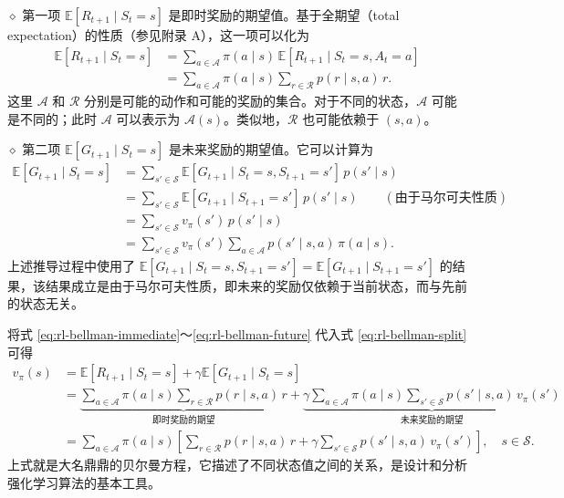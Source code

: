 \medskip
$\diamond$ 第一项 $\mathbb{E}[R_{t+1} \mid S_t = s]$ 是即时奖励的期望值。基于全期望（total expectation）的性质（参见附录 A），这一项可以化为
\begin{equation}
\begin{aligned}
\mathbb{E}[R_{t+1} \mid S_t = s] &= \sum_{a \in \mathcal{A}} \pi(a \mid s) \, \mathbb{E}[R_{t+1} \mid S_t = s, A_t = a] \\
&= \sum_{a \in \mathcal{A}} \pi(a \mid s) \sum_{r \in \mathcal{R}} p(r \mid s, a) \, r.
\end{aligned}
\label{eq:rl-bellman-immediate}
\end{equation}
这里 $\mathcal{A}$ 和 $\mathcal{R}$ 分别是可能的动作和可能的奖励的集合。对于不同的状态，$\mathcal{A}$ 可能是不同的；此时 $\mathcal{A}$ 可以表示为 $\mathcal{A}(s)$。类似地，$\mathcal{R}$ 也可能依赖于 $(s, a)$。

\medskip
$\diamond$ 第二项 $\mathbb{E}[G_{t+1} \mid S_t = s]$ 是未来奖励的期望值。它可以计算为
\begin{equation}
\begin{aligned}
\mathbb{E}[G_{t+1} \mid S_t = s] &= \sum_{s' \in \mathcal{S}} \mathbb{E}[G_{t+1} \mid S_t = s, S_{t+1} = s'] \, p(s' \mid s) \\
&= \sum_{s' \in \mathcal{S}} \mathbb{E}[G_{t+1} \mid S_{t+1} = s'] \, p(s' \mid s) \qquad (\text{由于马尔可夫性质}) \\
&= \sum_{s' \in \mathcal{S}} v_\pi(s') \, p(s' \mid s) \\
&= \sum_{s' \in \mathcal{S}} v_\pi(s') \sum_{a \in \mathcal{A}} p(s' \mid s, a) \, \pi(a \mid s).
\end{aligned}
\label{eq:rl-bellman-future}
\end{equation}
上述推导过程中使用了 $\mathbb{E}[G_{t+1} \mid S_t = s, S_{t+1} = s'] = \mathbb{E}[G_{t+1} \mid S_{t+1} = s']$ 的结果，该结果成立是由于马尔可夫性质，即未来的奖励仅依赖于当前状态，而与先前的状态无关。

将式 \cref{eq:rl-bellman-immediate}～\cref{eq:rl-bellman-future} 代入式 \cref{eq:rl-bellman-split} 可得
\begin{equation}
\begin{aligned}
v_\pi(s) &= \mathbb{E}[R_{t+1} \mid S_t = s] + \gamma \mathbb{E}[G_{t+1} \mid S_t = s] \\
&= \underbrace{\sum_{a \in \mathcal{A}} \pi(a \mid s) \sum_{r \in \mathcal{R}} p(r \mid s, a) \, r}_{\text{即时奖励的期望}}
+ \underbrace{\gamma \sum_{a \in \mathcal{A}} \pi(a \mid s) \sum_{s' \in \mathcal{S}} p(s' \mid s, a) \, v_\pi(s')}_{\text{未来奖励的期望}} \\
&= \sum_{a \in \mathcal{A}} \pi(a \mid s) \left[ \sum_{r \in \mathcal{R}} p(r \mid s, a) \, r + \gamma \sum_{s' \in \mathcal{S}} p(s' \mid s, a) \, v_\pi(s') \right], \quad s \in \mathcal{S}.
\end{aligned}
\label{eq:rl-bellman-main}
\end{equation}
上式就是大名鼎鼎的贝尔曼方程，它描述了不同状态值之间的关系，是设计和分析强化学习算法的基本工具。

